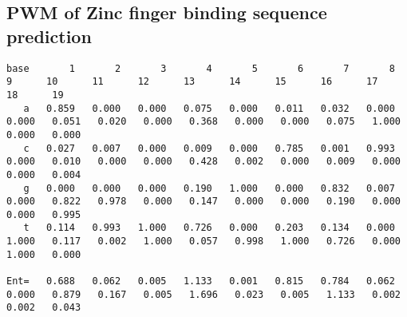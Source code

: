 \subsection*{PWM of Zinc finger binding sequence prediction}
\begin{lstlisting}[basicstyle=\tiny\ttfamily]
base       1       2       3       4       5       6       7       8       9      10      11      12      13      14      15      16      17      18      19 
   a   0.859   0.000   0.000   0.075   0.000   0.011   0.032   0.000   0.000   0.051   0.020   0.000   0.368   0.000   0.000   0.075   1.000   0.000   0.000 
   c   0.027   0.007   0.000   0.009   0.000   0.785   0.001   0.993   0.000   0.010   0.000   0.000   0.428   0.002   0.000   0.009   0.000   0.000   0.004 
   g   0.000   0.000   0.000   0.190   1.000   0.000   0.832   0.007   0.000   0.822   0.978   0.000   0.147   0.000   0.000   0.190   0.000   0.000   0.995 
   t   0.114   0.993   1.000   0.726   0.000   0.203   0.134   0.000   1.000   0.117   0.002   1.000   0.057   0.998   1.000   0.726   0.000   1.000   0.000 

Ent=   0.688   0.062   0.005   1.133   0.001   0.815   0.784   0.062   0.000   0.879   0.167   0.005   1.696   0.023   0.005   1.133   0.002   0.002   0.043 
\end{lstlisting}
